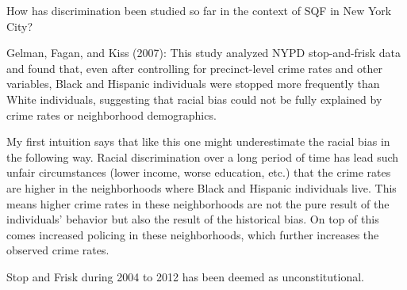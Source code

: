 How has discrimination been studied so far in the context of SQF in New York City?

Gelman, Fagan, and Kiss (2007): This study analyzed NYPD stop-and-frisk data and found that,
even after controlling for precinct-level crime rates and other variables, Black and Hispanic
individuals were stopped more frequently than White individuals, suggesting that racial bias
could not be fully explained by crime rates or neighborhood demographics.

My first intuition says that like this one might underestimate the racial bias in the following way.
Racial discrimination over a long period of time has lead such unfair circumstances
(lower income, worse education, etc.) that the crime rates are higher in the neighborhoods
where Black and Hispanic individuals live. This means higher crime rates in these neighborhoods
are not the pure result of the individuals' behavior but also the result of the historical bias.
On top of this comes increased policing in these neighborhoods, which further increases the observed
crime rates. 

Stop and Frisk during 2004 to 2012 has been deemed as unconstitutional.